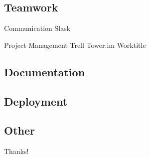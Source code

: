 \documentclass[UTF8]{beamer}
\begin{document}
\subsection{Teamwork}
\begin{frame}[t]{Communication}
    Slask
\end{frame}

\begin{frame}[t]{Project Management}
    Trell
    Tower.im
    Worktitle
\end{frame}

\subsection{Documentation}

\subsection{Deployment}

\subsection{Other}

\begin{frame}
  \centerline{\Huge{Thanks!}}
\end{frame}
\end{document}
